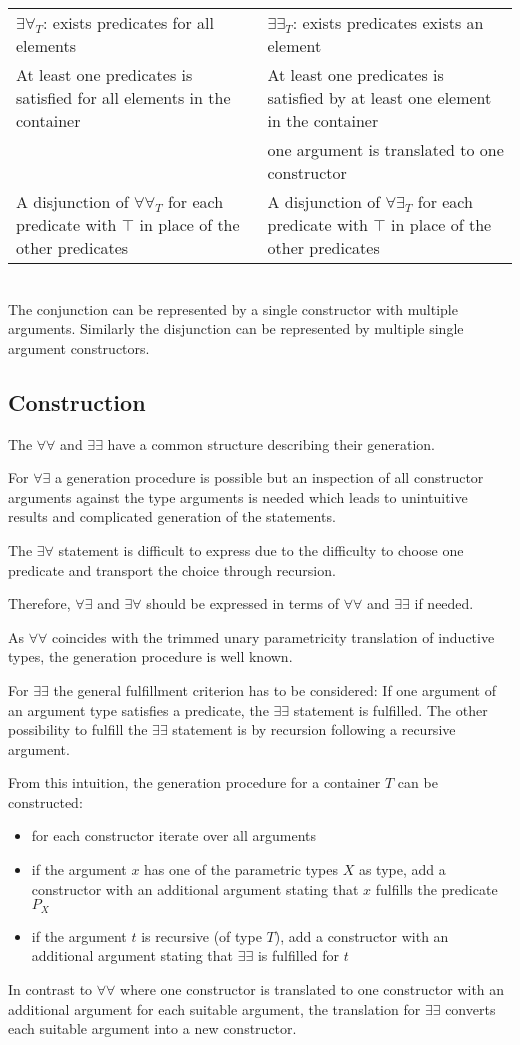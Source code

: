 \noindent\makebox[\linewidth]{\rule{\textwidth}{0.4pt}}
\begin{tabularx}{\textwidth}{ m|m }
$\exists\forall_T$: exists predicates for all elements &
$\exists\exists_T$: exists predicates exists an element \\
At least one predicates is satisfied for all elements in the container &
At least one predicates is satisfied by at least one element in the container \\
&
one argument is translated to one constructor\\
A disjunction of $\forall\forall_T$ for each predicate with $\top$ in place of the other predicates &
A disjunction of $\forall\exists_T$ for each predicate with $\top$ in place of the other predicates
\end{tabularx}
\ \\
The conjunction can be represented by a single constructor with multiple arguments.
Similarly the disjunction can be represented by multiple single argument constructors.


\subsection{Construction}
The $\forall\forall$ and $\exists\exists$ have a common structure describing
their generation.

For $\forall\exists$ a generation procedure is possible but an inspection of 
all constructor arguments against the type arguments is needed which leads
to unintuitive results and complicated generation of the statements.

The $\exists\forall$ statement is difficult to express due to the difficulty
to choose one predicate and transport the choice through recursion.

Therefore, $\forall\exists$ and $\exists\forall$ should be expressed in terms
of $\forall\forall$ and $\exists\exists$ if needed.

As $\forall\forall$ coincides with the trimmed unary parametricity translation 
of inductive types, the generation procedure is well known.

For $\exists\exists$ the general fulfillment criterion has to be considered:
If one argument of an argument type satisfies a predicate, the $\exists\exists$ 
statement is fulfilled. The other possibility to fulfill the $\exists\exists$ statement
is by recursion following a recursive argument.

From this intuition, the generation procedure for a container $T$ can be constructed:
\begin{itemize}
    \item for each constructor iterate over all arguments
    \item if the argument $x$ has one of the parametric types $X$ as type,
        add a constructor with an additional argument stating that
            $x$ fulfills the predicate $P_X$
    \item if the argument $t$ is recursive (of type $T$), add a constructor 
        with an additional argument stating that $\exists\exists$ is fulfilled for $t$
\end{itemize}

In contrast to $\forall\forall$ where one constructor is translated to 
one constructor with an additional argument for each suitable argument,
the translation for $\exists\exists$ converts each suitable argument into a new constructor.



